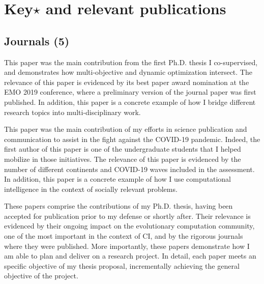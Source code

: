 \section{Key$\star$ and relevant publications}\closesection
{}
\subsection{Journals (5)}
{This paper was the main contribution from the first Ph.D. thesis I co-supervised, and demonstrates how multi-objective and dynamic optimization intersect. The relevance of this paper is evidenced by its best paper award nomination at the EMO 2019 conference, where a preliminary version of the journal paper was first published. In addition, this paper is a concrete example of how I bridge different research topics into multi-disciplinary work.}  

{This paper was the main contribution of my efforts in science publication and communication to assist in the fight against the COVID-19 pandemic. Indeed, the first author of this paper is one of the undergraduate students that I helped mobilize in those initiatives. The relevance of this paper is evidenced by the number of different continents and COVID-19 waves included in the assessment. In addition, this paper is a concrete example of how I use computational intelligence in the context of socially relevant problems. }

\cvline{}{\hrule}
{}
{}
{These papers comprise the contributions of my Ph.D. thesis, having been accepted for publication prior to my defense or shortly after. Their relevance is evidenced by their ongoing impact on the evolutionary computation community, one of the most important in the context of CI, and by the rigorous journals where they were published. More importantly, these papers demonstrate how I am able to plan and deliver on a research project. In detail, each paper meets an specific objective of my thesis proposal, incrementally achieving the general objective of the project.}  


